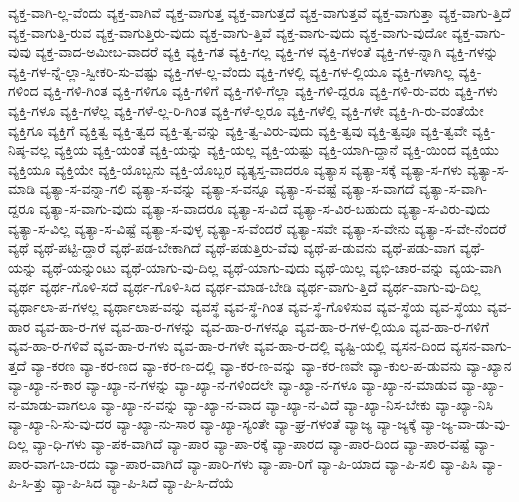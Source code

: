 {ವ್ಯಕ್ತ-ವಾಗಿ-ಲ್ಲ-ವೆಂದು
ವ್ಯಕ್ತ-ವಾಗಿವೆ
ವ್ಯಕ್ತ-ವಾಗುತ್ತ
ವ್ಯಕ್ತ-ವಾಗುತ್ತದೆ
ವ್ಯಕ್ತ-ವಾಗುತ್ತವೆ
ವ್ಯಕ್ತ-ವಾಗುತ್ತಾ
ವ್ಯಕ್ತ-ವಾಗು-ತ್ತಿದೆ
ವ್ಯಕ್ತ-ವಾಗುತ್ತಿ-ರುವ
ವ್ಯಕ್ತ-ವಾಗುತ್ತಿರು-ವುದು
ವ್ಯಕ್ತ-ವಾಗು-ತ್ತಿವೆ
ವ್ಯಕ್ತ-ವಾಗು-ವುದು
ವ್ಯಕ್ತ-ವಾಗು-ವುದೋ
ವ್ಯಕ್ತ-ವಾಗು-ವುವು
ವ್ಯಕ್ತ-ವಾದ-ಅಮೀಬ-ವಾದರೆ
ವ್ಯಕ್ತಿ
ವ್ಯಕ್ತಿ-ಗತ
ವ್ಯಕ್ತಿ-ಗಲ್ಲ
ವ್ಯಕ್ತಿ-ಗಳ
ವ್ಯಕ್ತಿ-ಗಳಂತೆ
ವ್ಯಕ್ತಿ-ಗಳ-ನ್ನಾಗಿ
ವ್ಯಕ್ತಿ-ಗಳನ್ನು
ವ್ಯಕ್ತಿ-ಗಳ-ನ್ನೆ-ಲ್ಲಾ-ಸ್ವೀಕರಿ-ಸು-ವಷ್ಟು
ವ್ಯಕ್ತಿ-ಗಳ-ಲ್ಲ-ವೆಂದು
ವ್ಯಕ್ತಿ-ಗಳಲ್ಲಿ
ವ್ಯಕ್ತಿ-ಗಳ-ಲ್ಲಿಯೂ
ವ್ಯಕ್ತಿ-ಗಳಾಗಿಲ್ಲ
ವ್ಯಕ್ತಿ-ಗಳಿಂದ
ವ್ಯಕ್ತಿ-ಗಳಿ-ಗಿಂತ
ವ್ಯಕ್ತಿ-ಗಳಿಗೂ
ವ್ಯಕ್ತಿ-ಗಳಿಗೆ
ವ್ಯಕ್ತಿ-ಗಳಿ-ಗೆಲ್ಲಾ
ವ್ಯಕ್ತಿ-ಗಳಿ-ದ್ದರೂ
ವ್ಯಕ್ತಿ-ಗಳಿ-ರು-ವರು
ವ್ಯಕ್ತಿ-ಗಳು
ವ್ಯಕ್ತಿ-ಗಳೂ
ವ್ಯಕ್ತಿ-ಗಳೆಲ್ಲ
ವ್ಯಕ್ತಿ-ಗಳೆ-ಲ್ಲ-ರಿ-ಗಿಂತ
ವ್ಯಕ್ತಿ-ಗಳೆ-ಲ್ಲರೂ
ವ್ಯಕ್ತಿ-ಗಳೆಲ್ಲಿ
ವ್ಯಕ್ತಿ-ಗಳೇ
ವ್ಯಕ್ತಿ-ಗಿ-ರು-ವಂತೆಯೇ
ವ್ಯಕ್ತಿಗೂ
ವ್ಯಕ್ತಿಗೆ
ವ್ಯಕ್ತಿತ್ವ
ವ್ಯಕ್ತಿ-ತ್ವದ
ವ್ಯಕ್ತಿ-ತ್ವ-ವನ್ನು
ವ್ಯಕ್ತಿ-ತ್ವ-ವಿರು-ವುದು
ವ್ಯಕ್ತಿ-ತ್ವವು
ವ್ಯಕ್ತಿ-ತ್ವವೂ
ವ್ಯಕ್ತಿ-ತ್ವವೇ
ವ್ಯಕ್ತಿ-ನಿಷ್ಠ-ವಲ್ಲ
ವ್ಯಕ್ತಿಯ
ವ್ಯಕ್ತಿ-ಯಂತೆ
ವ್ಯಕ್ತಿ-ಯನ್ನು
ವ್ಯಕ್ತಿ-ಯಲ್ಲ
ವ್ಯಕ್ತಿ-ಯಷ್ಟು
ವ್ಯಕ್ತಿ-ಯಾಗಿ-ದ್ದಾನೆ
ವ್ಯಕ್ತಿ-ಯಿಂದ
ವ್ಯಕ್ತಿಯು
ವ್ಯಕ್ತಿಯೂ
ವ್ಯಕ್ತಿಯೇ
ವ್ಯಕ್ತಿ-ಯೊಬ್ಬನು
ವ್ಯಕ್ತಿ-ಯೊಬ್ಬರ
ವ್ಯತ್ಯಸ್ತ-ವಾದರೂ
ವ್ಯತ್ಯಾಸ
ವ್ಯತ್ಯಾ-ಸಕ್ಕೆ
ವ್ಯತ್ಯಾ-ಸ-ಗಳು
ವ್ಯತ್ಯಾ-ಸ-ಮಾಡಿ
ವ್ಯತ್ಯಾ-ಸ-ವನ್ನಾ-ಗಲಿ
ವ್ಯತ್ಯಾ-ಸ-ವನ್ನು
ವ್ಯತ್ಯಾ-ಸ-ವನ್ನೂ
ವ್ಯತ್ಯಾ-ಸ-ವಷ್ಟೆ
ವ್ಯತ್ಯಾ-ಸ-ವಾಗದೆ
ವ್ಯತ್ಯಾ-ಸ-ವಾಗಿ-ದ್ದರೂ
ವ್ಯತ್ಯಾ-ಸ-ವಾಗು-ವುದು
ವ್ಯತ್ಯಾ-ಸ-ವಾದರೂ
ವ್ಯತ್ಯಾ-ಸ-ವಿದೆ
ವ್ಯತ್ಯಾ-ಸ-ವಿರ-ಬಹುದು
ವ್ಯತ್ಯಾ-ಸ-ವಿರು-ವುದು
ವ್ಯತ್ಯಾ-ಸ-ವಿಲ್ಲ
ವ್ಯತ್ಯಾ-ಸ-ವಿಷ್ಟೆ
ವ್ಯತ್ಯಾ-ಸ-ವುಳ್ಳ
ವ್ಯತ್ಯಾ-ಸ-ವೆಂದರೆ
ವ್ಯತ್ಯಾ-ಸವೇ
ವ್ಯತ್ಯಾ-ಸ-ವೇನು
ವ್ಯತ್ಯಾ-ಸ-ವೇ-ನೆಂದರೆ
ವ್ಯಥೆ
ವ್ಯಥೆ-ಪಟ್ಟಿ-ದ್ದಾರೆ
ವ್ಯಥೆ-ಪಡ-ಬೇಕಾಗಿದೆ
ವ್ಯಥೆ-ಪಡುತ್ತಿರು-ವೆವು
ವ್ಯಥೆ-ಪ-ಡುವನು
ವ್ಯಥೆ-ಪಡು-ವಾಗ
ವ್ಯಥೆ-ಯನ್ನು
ವ್ಯಥೆ-ಯನ್ನುಂಟು
ವ್ಯಥೆ-ಯಾಗು-ವು-ದಿಲ್ಲ
ವ್ಯಥೆ-ಯಾಗು-ವುದು
ವ್ಯಥೆ-ಯಿಲ್ಲ
ವ್ಯಭಿ-ಚಾರ-ವನ್ನು
ವ್ಯಯ-ವಾಗಿ
ವ್ಯರ್ಥ
ವ್ಯರ್ಥ-ಗೊಳಿ-ಸದೆ
ವ್ಯರ್ಥ-ಗೊಳಿ-ಸಿದ
ವ್ಯರ್ಥ-ಮಾಡ-ಬೇಡಿ
ವ್ಯರ್ಥ-ವಾಗು-ತ್ತಿದೆ
ವ್ಯರ್ಥ-ವಾಗು-ವು-ದಿಲ್ಲ
ವ್ಯರ್ಥಾಲಾ-ಪ-ಗಳಲ್ಲ
ವ್ಯರ್ಥಾಲಾಪ-ವನ್ನು
ವ್ಯವಸ್ಥೆ
ವ್ಯವ-ಸ್ಥೆ-ಗಿಂತ
ವ್ಯವ-ಸ್ಥೆ-ಗೊಳಿಸುವ
ವ್ಯವ-ಸ್ಥೆಯ
ವ್ಯವ-ಸ್ಥೆಯು
ವ್ಯವ-ಹಾರ
ವ್ಯವ-ಹಾ-ರ-ಗಳ
ವ್ಯವ-ಹಾ-ರ-ಗಳನ್ನು
ವ್ಯವ-ಹಾ-ರ-ಗಳನ್ನೂ
ವ್ಯವ-ಹಾ-ರ-ಗಳ-ಲ್ಲಿಯೂ
ವ್ಯವ-ಹಾ-ರ-ಗಳಿಗೆ
ವ್ಯವ-ಹಾ-ರ-ಗಳಿವೆ
ವ್ಯವ-ಹಾ-ರ-ಗಳು
ವ್ಯವ-ಹಾ-ರ-ಗಳೇ
ವ್ಯವ-ಹಾ-ರ-ದಲ್ಲಿ
ವ್ಯಷ್ಟಿ-ಯಲ್ಲಿ
ವ್ಯಸನ-ದಿಂದ
ವ್ಯಸನ-ವಾಗು-ತ್ತದೆ
ವ್ಯಾ-ಕರಣ
ವ್ಯಾ-ಕರ-ಣದ
ವ್ಯಾ-ಕರ-ಣ-ದಲ್ಲಿ
ವ್ಯಾ-ಕರ-ಣ-ವನ್ನು
ವ್ಯಾ-ಕರ-ಣವೇ
ವ್ಯಾ-ಕುಲ-ಪ-ಡುವನು
ವ್ಯಾ-ಖ್ಯಾನ
ವ್ಯಾ-ಖ್ಯಾ-ನ-ಕಾರ
ವ್ಯಾ-ಖ್ಯಾ-ನ-ಗಳನ್ನು
ವ್ಯಾ-ಖ್ಯಾ-ನ-ಗಳಿಂದಲೇ
ವ್ಯಾ-ಖ್ಯಾ-ನ-ಗಳೂ
ವ್ಯಾ-ಖ್ಯಾ-ನ-ಮಾಡುವ
ವ್ಯಾ-ಖ್ಯಾ-ನ-ಮಾಡು-ವಾಗಲೂ
ವ್ಯಾ-ಖ್ಯಾ-ನ-ವನ್ನು
ವ್ಯಾ-ಖ್ಯಾ-ನ-ವಾದ
ವ್ಯಾ-ಖ್ಯಾ-ನ-ವಿದೆ
ವ್ಯಾ-ಖ್ಯಾ-ನಿಸ-ಬೇಕು
ವ್ಯಾ-ಖ್ಯಾ-ನಿಸಿ
ವ್ಯಾ-ಖ್ಯಾ-ನಿ-ಸು-ವು-ದರ
ವ್ಯಾ-ಖ್ಯಾ-ನು-ಸಾರ
ವ್ಯಾ-ಖ್ಯಾ-ಸ್ಯಂತೇ
ವ್ಯಾ-ಘ್ರ-ಗಳಂತೆ
ವ್ಯಾಜ್ಯ
ವ್ಯಾ-ಜ್ಯಕ್ಕೆ
ವ್ಯಾ-ಜ್ಯ-ವಾ-ಡು-ವು-ದಿಲ್ಲ
ವ್ಯಾ-ಧಿ-ಗಳು
ವ್ಯಾ-ಪಕ-ವಾಗಿದೆ
ವ್ಯಾ-ಪಾರ
ವ್ಯಾ-ಪಾ-ರಕ್ಕೆ
ವ್ಯಾ-ಪಾರದ
ವ್ಯಾ-ಪಾರ-ದಿಂದ
ವ್ಯಾ-ಪಾರ-ವಷ್ಟೆ
ವ್ಯಾ-ಪಾರ-ವಾಗ-ಬಾ-ರದು
ವ್ಯಾ-ಪಾರ-ವಾಗಿದೆ
ವ್ಯಾ-ಪಾರಿ-ಗಳು
ವ್ಯಾ-ಪಾ-ರಿಗೆ
ವ್ಯಾ-ಪಿ-ಯಾದ
ವ್ಯಾ-ಪಿ-ಸಲಿ
ವ್ಯಾ-ಪಿಸಿ
ವ್ಯಾ-ಪಿ-ಸಿ-ತ್ತು
ವ್ಯಾ-ಪಿ-ಸಿದ
ವ್ಯಾ-ಪಿ-ಸಿದೆ
ವ್ಯಾ-ಪಿ-ಸಿ-ದೆಯೆ
}
